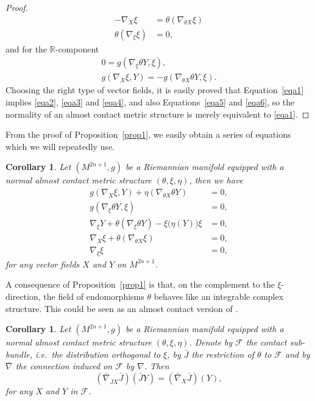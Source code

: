 \documentclass[a4paper,reqno]{amsart}
\newtheorem{corollary}[thm]{Corollary}
\theoremstyle{definition}
\theoremstyle{remark}
\theoremstyle{plain}
\numberwithin{equation}{section}
\newcommand{\rn}{\mathbb R}
\newcommand{\f}{\mathcal{F}}
\begin{document}
\begin{proof}
\begin{align}
- \nabla_{X}\xi &= \theta (\nabla_{\theta X}\xi) \label{eqa3}\\
\theta(\nabla_{\xi}\xi)&=0 ,\label{eqa4}
\end{align} 
and for the $\rn$-component
\begin{align} 
0= g(\nabla_{\xi}\theta Y, \xi), \label{eqa5}\\
g(\nabla_X\xi, Y)=-g(\nabla_{\theta X}\theta Y, \xi). \label{eqa6}
\end{align}
Choosing the right type of vector fields, it is easily proved that
Equation~\eqref{eqa1} implies \eqref{eqa2}, \eqref{eqa3} and
\eqref{eqa4}, and also Equations~\eqref{eqa5} and \eqref{eqa6},
so the normality of an almost contact metric structure is merely
equivalent to \eqref{eqa1}.
\end{proof}

From the proof of Proposition~\ref{prop1}, we easily obtain a
series of equations which  we will repeatedly use. 
\begin{corollary}\label{corollary1.1}
  Let $(M^{2n+1},g)$ be a Riemannian manifold equipped with a
  normal almost contact metric structure $(\theta,\xi,\eta)$,
  then we have
\begin{align}
g(\nabla_X \xi, Y) +\eta(\nabla_{\theta X}\theta Y)&=0, \label{eq1}\\
g(\nabla_{\xi}\theta Y, \xi)&=0,\label{eq2}\\
\nabla_{\xi} Y + \theta(\nabla_{\xi}\theta Y)- \xi\bigl(\eta(Y)\bigr) \xi &=0,\label{eq3}\\
\nabla_X \xi +\theta(\nabla_{\theta X}\xi)&=0,\label{eq4}\\
\nabla_{\xi} \xi&=0 \label{eq5}, 
\end{align}
for any vector fields $X$ and $Y$ on $M^{2n+1}$.
\end{corollary}

A consequence of Proposition~\ref{prop1} is that, on the
complement to the $\xi$-direction, the field of endomorphisms
$\theta$ behaves like an integrable complex structure. This could be seen as an almost contact version of \cite[Lemma 2.1]{VW2}.

\begin{corollary}\label{corollary1}
  Let $(M^{2n+1},g)$ be a Riemannian manifold equipped with a
  normal almost contact metric structure
  $(\theta,\xi,\eta)$. Denote by $\f$ the contact sub-bundle,
  i.e.~the distribution orthogonal to $\xi$, by $\bar{J}$ the
  restriction of $\theta$ to $\f$ and by $\bar{\nabla}$ the
  connection induced on $\f$ by $\nabla$. Then
$$(\bar{\nabla}_{\bar{J}X}\bar{J})(\bar{J}Y) = (\bar{\nabla}_X \bar{J})(Y),$$
for any $X$ and $Y$ in $\f$.
\end{corollary}
\end{document}
